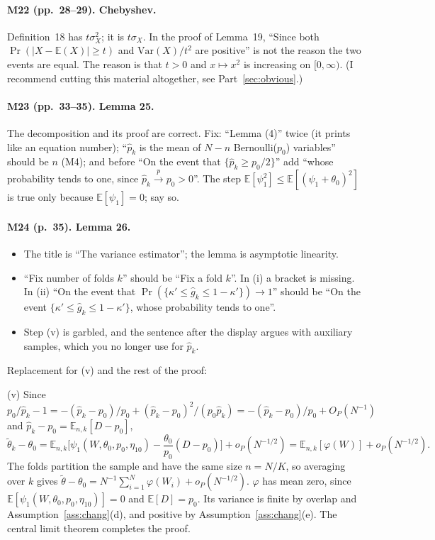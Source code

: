 \documentclass[11pt]{article}
\providecommand{\E}{\mathbb{E}}
\newenvironment{ins}{\begin{leftbar}}{\end{leftbar}}
\theoremstyle{plain}
\theoremstyle{remark}
\begin{document}
\paragraph{M22 (pp.~28--29). Chebyshev.}
Definition~18 has $t\sigma_X^2$; it is $t\sigma_X$. In the proof of Lemma~19,
``Since both $\Pr(|X-\E(X)|\ge t)$ and $\mathrm{Var}(X)/t^2$ are positive'' is not
the reason the two events are equal. The reason is that $t>0$ and
$x\mapsto x^2$ is increasing on $[0,\infty)$. (I recommend cutting this
material altogether, see Part~\ref{sec:obvious}.)

\paragraph{M23 (pp.~33--35). Lemma 25.} The decomposition and its proof are
correct. Fix: ``Lemma (4)'' twice (it prints like an equation number);
``$\hat p_k$ is the mean of $N-n$ Bernoulli($p_0$) variables'' should be $n$
(M4); and before ``On the event that $\{\hat p_k\ge p_0/2\}$'' add ``whose
probability tends to one, since $\hat p_k\xrightarrow{p}p_0>0$''. The step
$\E[\psi_1^2]\le\E[(\psi_1+\theta_0)^2]$ is true only because $\E[\psi_1]=0$;
say so.

\paragraph{M24 (p.~35). Lemma 26.}
\begin{itemize}
\item The title is ``The variance estimator''; the lemma is asymptotic
  linearity.
\item ``Fix number of folds $k$'' should be ``Fix a fold $k$''. In (i) a bracket
  is missing. In (ii) ``On the event that
  $\Pr(\{\kappa'\le\hat g_k\le1-\kappa'\})\to1$'' should be ``On the event
  $\{\kappa'\le\hat g_k\le1-\kappa'\}$, whose probability tends to one''.
\item Step (v) is garbled, and the sentence after the display argues with
  auxiliary samples, which you no longer use for $\hat p_k$.
\end{itemize}
Replacement for (v) and the rest of the proof:
\begin{ins}
(v) Since
$p_0/\hat p_k-1=-(\hat p_k-p_0)/p_0+(\hat p_k-p_0)^2/(p_0\hat p_k)
=-(\hat p_k-p_0)/p_0+O_P(N^{-1})$ and $\hat p_k-p_0=\E_{n,k}[D-p_0]$,
\[
  \tilde\theta_k-\theta_0=\E_{n,k}\Big[\psi_1(W,\theta_0,p_0,\eta_{10})-\frac{\theta_0}{p_0}(D-p_0)\Big]+o_P(N^{-1/2})
  =\E_{n,k}[\varphi(W)]+o_P(N^{-1/2}).
\]
The folds partition the sample and have the same size $n=N/K$, so averaging over
$k$ gives $\tilde\theta-\theta_0=N^{-1}\sum_{i=1}^N\varphi(W_i)+o_P(N^{-1/2})$.
$\varphi$ has mean zero, since $\E[\psi_1(W,\theta_0,p_0,\eta_{10})]=0$ and
$\E[D]=p_0$. Its variance is finite by overlap and
Assumption~\ref{ass:chang}(d), and positive by
Assumption~\ref{ass:chang}(e). The central limit theorem completes the proof.
\end{ins}
\end{document}
